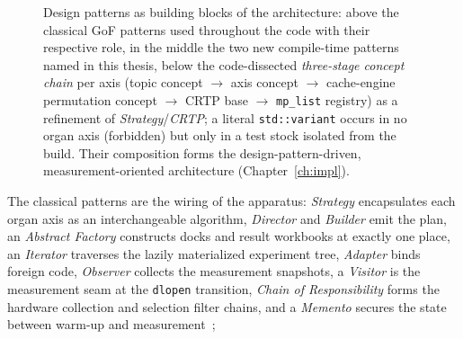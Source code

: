 \begin{nurkurz}
\begin{figure}[htbp]
\caption{Design patterns as building blocks of the architecture: above the classical GoF patterns used throughout the code with their respective role, in the middle the two new compile-time patterns named in this thesis, below the code-dissected \emph{three-stage concept chain} per axis (topic concept $\to$ axis concept $\to$ cache-engine permutation concept $\to$ CRTP base $\to$ \texttt{mp\_list} registry) as a refinement of \emph{Strategy}/\emph{CRTP}; a literal \texttt{std::variant} occurs in no organ axis (forbidden) but only in a test stock isolated from the build. Their composition forms the design-pattern-driven, measurement-oriented architecture (Chapter~\ref{ch:impl}).}\label{fig:patterns}
\end{figure}
The classical patterns are the wiring of the apparatus: \emph{Strategy} encapsulates each organ axis as
an interchangeable algorithm, \emph{Director} and \emph{Builder} emit the plan, an \emph{Abstract
Factory} constructs docks and result workbooks at exactly one place, an \emph{Iterator} traverses the
lazily materialized experiment tree, \emph{Adapter} binds foreign code, \emph{Observer} collects the
measurement snapshots, a \emph{Visitor} is the measurement seam at the \texttt{dlopen} transition,
\emph{Chain of Responsibility} forms the hardware collection and selection filter chains, and a
\emph{Memento} secures the state between warm-up and measurement~\cite{gamma1994patterns};

\end{nurkurz}
